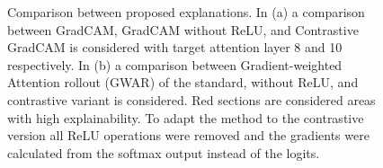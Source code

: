 \begin{figure}
{\begin{subfigure}{.5\textwidth}
\begin{tabular}
\end{tabular}
\caption{} \label{fig:vit-gradcam-new-b}
\end{subfigure}
}

\caption{Comparison between proposed explanations. In (a) a comparison between GradCAM, GradCAM without ReLU, and Contrastive GradCAM is considered with target attention layer 8 and 10 respectively. In (b) a comparison between Gradient-weighted Attention rollout (GWAR) of the standard, without ReLU, and contrastive variant is considered. Red sections are considered areas with high explainability. To adapt the method to the contrastive version all ReLU operations were removed and the gradients were calculated from the softmax output instead of the logits.} \label{t:}
\end{figure}